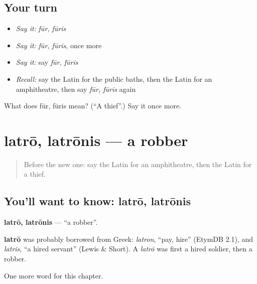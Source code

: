 \subsection*{Your turn}
\begin{itemize}
\raggedright
  \item \emph{Say it:} \emph{fūr, fūris}
  \item \emph{Say it:} \emph{fūr, fūris}, once more
  \item \emph{Say it:} say \emph{fūr, fūris}
  \item \emph{Recall:} say the Latin for the public baths, then the Latin for an amphitheatre, then say \emph{fūr, fūris} again
\end{itemize}

\begin{tcolorbox}[breakable,colback=teal!4,colframe=teal!35!black,title={Before you move on}]
What does fūr, fūris mean? (\textquotedblleft{}A thief\textquotedblright{}.) Say it once more.
\end{tcolorbox}
\section[latrō, latrōnis]{latrō, latrōnis — a robber}

\label{lesson:LA-C245-latro}



\begin{quote}
Before the new one: say the Latin for an amphitheatre, then the Latin for a thief.
\end{quote}

\subsection*{You'll want to know: latrō, latrōnis}
\textbf{latrō, latrōnis} — \textquotedblleft{}a robber\textquotedblright{}.

\begin{cousinweb}
\textbf{latrō} was probably borrowed from Greek: \emph{latron}, \textquotedblleft{}pay, hire\textquotedblright{} (EtymDB 2.1), and \emph{latris}, \textquotedblleft{}a hired servant\textquotedblright{} (Lewis \& Short). A \emph{latrō} was first a hired soldier, then a robber.
\end{cousinweb}

\begin{grammarlens}[title={What you've built}]
One more word for this chapter.
\end{grammarlens}

